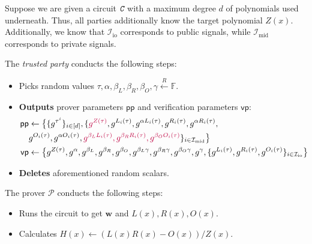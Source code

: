 \documentclass[../lecture-notes.tex]{subfiles}
\begin{document}
\begin{tcolorbox}[breakable, title=Attempt \#5: Turning SNARK into zk-SNARK,
    colback=blue!5!white,
    colframe=blue!75!black,
    colbacktitle=blue!25!white,
    coltitle=blue!20!black,
    fonttitle=\bfseries,
    boxrule=1.25pt,
    subtitle style={boxrule=0pt,
    colback=blue!20!white,
    colupper=blue!75!gray} ]
    \small
    Suppose we are given a circuit $\textit{\texttt{C}}$ with a maximum degree $d$ of polynomials used underneath. Thus, all parties additionally know the target polynomial $Z(x)$. Additionally, we know that $\mathcal{I}_{\text{io}}$ corresponds to public signals, while $\mathcal{I}_{\text{mid}}$ corresponds to private signals.

    The \emph{trusted party} conducts the following steps:
    \begin{itemize}[label=]
        \item Picks random values $\tau, \alpha, \beta_L, \beta_R, \beta_O, \gamma \xleftarrow{R} \mathbb{F}$.
        \item \textbf{Outputs} prover parameters $\mathsf{pp}$ and verification parameters $\mathsf{vp}$:
        \begin{align*}
            \mathsf{pp} &\gets \big\{\{g^{\tau^i}\}_{i \in [d]}, \{\textcolor{purple}{g^{Z(\tau)}}, g^{L_i(\tau)}, g^{\alpha L_i(\tau)}, g^{R_i(\tau)}, g^{\alpha R_i(\tau)}, \\ 
            & g^{O_i(\tau)}, g^{\alpha O_i(\tau)}, \textcolor{purple}{g^{\beta_LL_i(\tau)}, g^{\beta_RR_i(\tau)}, g^{\beta_OO_i(\tau)}}\}_{i \in \mathcal{I}_{\text{mid}}}\big\} \\
            \mathsf{vp} &\gets \big\{ g^{Z(\tau)}, g^{\alpha}, g^{\beta_L}, g^{\beta_R}, g^{\beta_O}, g^{\beta_L\gamma}, g^{\beta_R\gamma}, g^{\beta_O\gamma}, g^{\gamma}, \{g^{L_i(\tau)}, g^{R_i(\tau)}, g^{O_i(\tau)}\}_{i \in \mathcal{I}_{\text{io}}} \big\}
        \end{align*}
        \item \textbf{Deletes} aforementioned random scalars.
    \end{itemize}
    The prover $\mathcal{P}$ conducts the following steps:
    \begin{itemize}[label=, left=0.5em]
        \item Runs the circuit to get $\mathbf{w}$ and $L(x),R(x),O(x)$.
        \item Calculates $H(x) \gets (L(x)R(x) - O(x))\big/ Z(x)$.

\end{itemize}
\end{tcolorbox}
\end{document}
